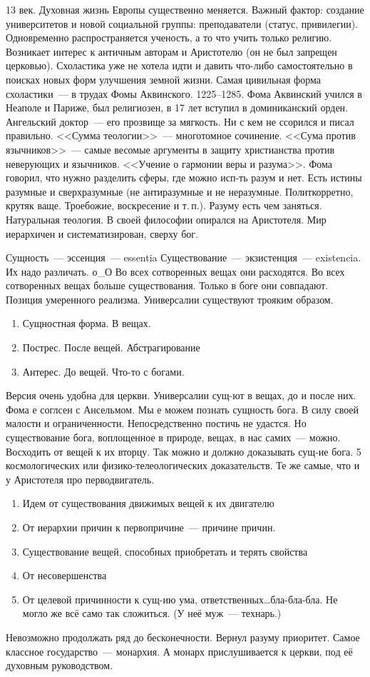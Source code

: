 13 век. Духовная жизнь Европы существенно меняется. Важный фактор: создание университетов и новой социальной группы: преподаватели (статус, привилегии). Одновременно распространяется ученость, а то что учить только религию. Возникает интерес к античным авторам и Аристотелю (он не был запрещен церковью). Схоластика уже не хотела идти и давить что-либо самостоятельно в поисках новых форм улучшения земной жизни. Самая цивильная форма схоластики~--- в трудах Фомы Аквинского. 1225--1285. Фома Аквинский учился в Неаполе и Париже, был религиозен, в 17 лет вступил в доминиканский орден. Ангельский доктор~--- его прозвище за мягкость. Ни с кем не ссорился и писал правильно. <<Сумма теологии>>~--- многотомное сочинение. <<Сума против язычников>>~--- самые весомые аргументы в защиту христианства против неверующих и язычников. <<Учение о гармонии веры и разума>>. Фома говорил, что нужно разделить сферы, где можно исп-ть разум и нет. Есть истины разумные и сверхразумные (не антиразумные и не неразумные. Политкорретно, крутяк ваще. Троебожие, воскресение и т.\,п.). Разуму есть чем заняться. Натуральная теология. В своей философии опирался на Аристотеля. Мир иерархичен и систематизирован, сверху бог.

Сущность~--- эссенция~--- essentia
Существование~--- экзистенция~--- existencia. Их надо различать. о\_О
Во всех сотворенных вещах они расходятся. Во всех сотворенных вещах больше существования. Только в боге они совпадают. Позиция умеренного реализма. Универсалии существуют трояким образом.

\begin{enumerate}
	\item Сущностная форма. В вещах.
	\item Пострес. После вещей. Абстрагирование
	\item Антерес. До вещей. Что-то с богами.
\end{enumerate}Версия очень удобна для церкви. Универсалии сущ-ют в вещах, до и после них.
Фома е соглсен с Ансельмом. Мы е можем познать сущность бога. В силу своей малости и ограниченности. Непосредственно постичь не удастся. Но существование бога, воплощенное в природе, вещах, в нас самих~--- можно. Восходить от вещей к их вторцу. Так можно и должно доказывать сущ-ие бога. 5 космологических или физико-телеологических доказательств. Те же самые, что и у Аристотеля про перводвигатель.

\begin{enumerate}
	\item Идем от существования движимых вещей к их двигателю
	\item От иерархии причин к первопричине~--- причине причин.
	\item Существование вещей, способных приобретать и терять свойства
	\item От несовершенства
	\item От целевой причинности к сущ-ию ума, ответственных\ldots бла-бла-бла. Не могло же всё само так сложиться. (У неё муж~--- технарь.) 
\end{enumerate}
Невозможно продолжать ряд до бесконечности.
Вернул разуму приоритет.
Самое классное государство~--- монархия. А монарх прислушивается к церкви, под её духовным руководством.


